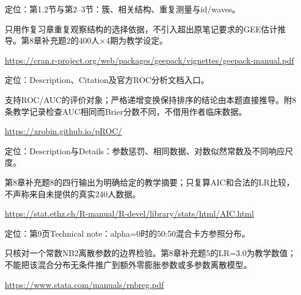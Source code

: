 \par\noindent\begin{minipage}{\linewidth}\raggedright{}\label{src:G8-GEE}
\par
定位：第1.2节与第2–3节：簇、相关结构、重复测量与id/waves。\par
只用作复习章重复观察结构的选择依据，不引入超出原笔记要求的GEE估计推导。第8章补充题2的400人×4期为教学设定。\par
{\small \url{https://cran.r-project.org/web/packages/geepack/vignettes/geepack-manual.pdf}}\par
\end{minipage}\par\medskip

\par\noindent\begin{minipage}{\linewidth}\raggedright{}\label{src:G8-ROC}
\par
定位：Description、Citation及官方ROC分析文档入口。\par
支持ROC/AUC的评价对象；严格递增变换保持排序的结论由本题直接推导。附8条教学记录检查AUC相同而Brier分数不同，不借用作者临床数据。\par
{\small \url{https://xrobin.github.io/pROC/}}\par
\end{minipage}\par\medskip

\par\noindent\begin{minipage}{\linewidth}\raggedright{}\label{src:G8-AIC}
\par
定位：Description与Details：参数惩罚、相同数据、对数似然常数及不同响应尺度。\par
第8章补充题8的四行输出为明确给定的教学摘要；只复算AIC和合法的LR比较，不声称来自未提供的真实240人数据。\par
{\small \url{https://stat.ethz.ch/R-manual/R-devel/library/stats/html/AIC.html}}\par
\end{minipage}\par\medskip

\par\noindent\begin{minipage}{\linewidth}\raggedright{}\label{src:G8-NB-LR}
\par
定位：第9页Technical note：alpha=0时的50:50混合卡方参照分布。\par
只核对一个常数NB2离散参数的边界检验。第8章补充题5的LR=3.0为教学数值；不能把该混合分布无条件推广到额外零膨胀参数或多参数离散模型。\par
{\small \url{https://www.stata.com/manuals/rnbreg.pdf}}\par
\end{minipage}\par\medskip

